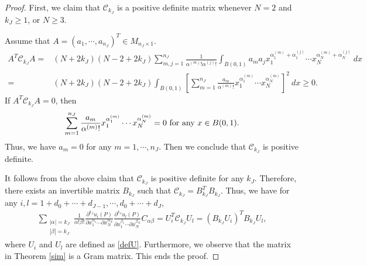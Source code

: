 \documentclass[11pt,reqno]{article}
\numberwithin{equation}{section}
\begin{document}
    \begin{proof}
        First, we claim that $ \mathcal{C}_{k_J}$ is a positive definite matrix whenever $N=2$ and $k_J\ge 1$, or $N\ge 3$. 

         Assume that $A=\left(a_1,\cdots,a_{n_J}\right)^{T} \in M_{n_J\times 1} $. 
    \begin{equation}\label{eq0512-2}
        \begin{aligned}
            A^T\mathcal{C}_{k_J}A=&(N+2k_J)(N-2+2k_J)\sum_{m,j=1}^{n_J}\frac{1}{\alpha^{(m)}!\alpha^{(j)}!}\int_{ B(0,1)}a_m a_j x_{1}^{\alpha_1^{(m)}+\alpha_1^{(j)}}\cdots x_{N}^{\alpha_N^{(m)}+\alpha_N^{(j)}} \ d x\\
            =&(N+2k_J)(N-2+2k_J)\int_{ B(0,1)}\left[\sum_{m=1}^{n_J}\frac{a_m}{\alpha^{(m)}!}x_{1}^{\alpha_1^{(m)}}\cdots x_{N}^{\alpha_N^{(m)}} \right]^2\ d x\geq 0.
        \end{aligned}
    \end{equation}
	If $A^T\mathcal{C}_{k_J}A=0$, then 
    \begin{equation}\label{eq0512-3}
        \sum_{m=1}^{n_J}\frac{a_m}{\alpha^{(m)}!}x_{1}^{\alpha_1^{(m)}}\cdots x_{N}^{\alpha_N^{(m)}}=0\ \hbox{for any }   x\in B(0,1). 
         \end{equation}
      Thus, we have $a_m=0$ for any $m=1,\cdots,n_J$. Then we conclude that $\mathcal{C}_{k_J}$ is positive definite.
        
        It follows from the above claim that   $\mathcal{C}_{k_J}$  is positive definite  for any $k_J$. Therefore,  there exists an invertible matrix $B_{k_J}$ such that $\mathcal{C}_{k_J}=B_{k_J}^TB_{k_J}$. Thus, we have for any $i,l=1+d_0+\cdots+d_{J-1},\cdots,d_0+\cdots+d_J$,
   \begin{equation}
   \begin{aligned}
       \sum_{\substack{|\alpha|={ k_J}\\
           |\beta|={ k_J}}}\frac{1}{\alpha!\beta!}\frac{\partial^{{ k_J}} u_{i} (P)}{\partial x_{1}^{\alpha_1}\cdots\partial x_{N}^{\alpha_N}}\frac{\partial^{{ k_J}} u_{l} (P)}{\partial x_{1}^{\beta_1}\cdots\partial x_{N}^{\beta_N}} C_{\alpha\beta} =U_i^T\mathcal{C}_{k_J}U_l=\left(B_{k_J}U_i\right)^TB_{k_J}U_l,
            \end{aligned}
   \end{equation}
   where $U_i$ and $U_l$ are defined as \eqref{defU}.
Furthermore, we observe that the matrix in Theorem \ref{sim}
is a Gram matrix. This ends the proof.
    \end{proof}
\end{document}
